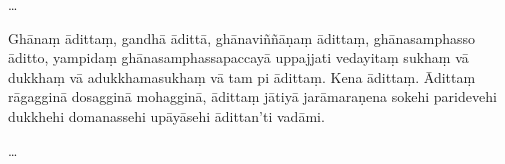 \ldots{}

\clearpage

\paliText
\markboth{\paliTitle}{\rightmark}

Ghānaṃ ādittaṃ, gandhā ādittā, ghānaviññāṇaṃ ādittaṃ, ghānasamphasso
āditto, yampidaṃ ghānasamphassapaccayā uppajjati vedayitaṃ sukhaṃ vā
dukkhaṃ vā adukkhamasukhaṃ vā tam pi ādittaṃ. Kena ādittaṃ. Ādittaṃ
rāgagginā dosagginā mohagginā, ādittaṃ jātiyā jarāmaraṇena sokehi
paridevehi dukkhehi domanassehi upāyāsehi ādittan'ti vadāmi.

\ldots{}

